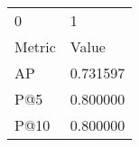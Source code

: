 \begin{tabular}{ll}
0 & 1 \\
Metric & Value \\
AP & 0.731597 \\
P@5 & 0.800000 \\
P@10 & 0.800000 \\
\end{tabular}
